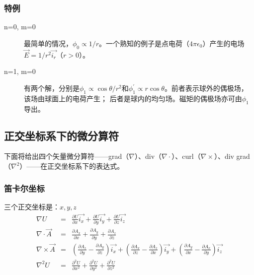 \subsubsection{特例}
\begin{description}
  \item[n=0, m=0] 最简单的情况，$\phi_0\propto 1/r$。一个熟知的例子是点电荷（$4\pi\epsilon_0$）产生的电场$\vec{E}=1/r^2 \vec{i_r}$（$r>0$）。
  \item[n=1, m=0] 有两个解，分别是$\phi_1 \propto \cos\theta /r^2$和$\phi_1^\prime\propto r\cos\theta$。前者表示球外的偶极场，该场由球面上的电荷产生；
  后者是球内的均匀场。磁矩的偶极场亦可由$\phi_1$导出。
\end{description}

\subsection{正交坐标系下的微分算符}
下面将给出四个矢量微分算符——grad（$\nabla$）、div（$\nabla\cdot$）、curl（$\nabla\times$）、div grad（$\nabla^2$）——在正交坐标系下的表达式。
\subsubsection{笛卡尔坐标}
三个正交坐标是：$x, y, z$
\begin{eqnarray}\label{eqn:field cart}
\nabla U&=&\frac{\partial U}{\partial x}\vec{i_x} +\frac{\partial U}{\partial y}\vec{i_y}+\frac{\partial U}{\partial z}\vec{i_z} \nonumber \\
\nabla\cdot \vec{A}&=& \frac{\partial{A_x}}{\partial x} +\frac{\partial{A_y}}{\partial y}+\frac{\partial{A_z}}{\partial z}\nonumber \\
\nabla\times \vec{A}&=& (\frac{\partial{A_z}}{\partial y} -\frac{\partial{A_y}}{\partial z})\vec{i_x} + (\frac{\partial{A_x}}{\partial z} -\frac{\partial{A_z}}{\partial x}) \vec{i_y}
+ (\frac{\partial{A_y}}{\partial x} -\frac{\partial{A_x}}{\partial y})\vec{i_z}  \nonumber \\
\nabla^2 U&=&\frac{\partial^2 U}{\partial x^2}+\frac{\partial^2 U}{\partial y^2}+\frac{\partial^2 U}{\partial z^2}
\end{eqnarray}

